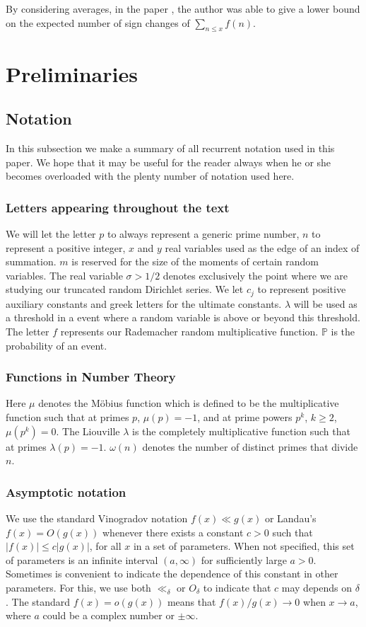 \documentclass[reqno0,12pt]{amsart}
\theoremstyle{remark}
\newcommand{\PP}{\mathbb{P}}
\begin{document}
By considering averages, in the paper \cite{aymone_sign_changes_III}, the author was able to give a lower bound on the expected number of sign changes of $\sum_{n\leq x}f(n)$. 


\section{Preliminaries}
\subsection{Notation} 
In this subsection we make a summary of all recurrent notation used in this paper. We hope that it may be useful for the reader always when he or she becomes overloaded with the plenty number of notation used here.

\subsubsection{Letters appearing throughout the text} We will let the letter $p$ to always represent a generic prime number, $n$ to represent a positive integer, $x$ and $y$ real variables used as the edge of an index of summation. $m$ is reserved for the size of the moments of certain random variables. The real variable $\sigma>1/2$ denotes exclusively the point where we are studying our truncated random Dirichlet series. We let $c_j$ to represent positive auxiliary constants and greek letters for the ultimate constants. $\lambda$ will be used as a threshold in a event where a random variable is above or beyond this threshold. The letter $f$ represents our Rademacher random multiplicative function. $\PP$ is the probability of an event.

\subsubsection{Functions in Number Theory} Here $\mu$ denotes the M\"obius function which is defined to be the multiplicative function such that at primes $p$, $\mu(p)=-1$, and at prime powers $p^k$, $k\geq 2$, $\mu(p^k)=0$. The Liouville $\lambda$ is the completely multiplicative function such that at primes $\lambda(p)=-1$. $\omega(n)$ denotes the number of distinct primes that divide $n$.

\subsubsection{Asymptotic notation} We use the standard Vinogradov notation $f(x)\ll g(x)$ or Landau's $f(x)=O(g(x))$ whenever there exists a constant $c>0$ such that $|f(x)|\leq c|g(x)|$, for all $x$ in a set of parameters. When not specified, this set of parameters is an infinite interval $(a,\infty)$ for sufficiently large $a>0$. Sometimes is convenient to indicate the dependence of this constant in other parameters. For this, we use both $\ll_\delta$ or $O_\delta$ to indicate that $c$ may depends on $\delta$. The standard $f(x)=o(g(x))$ means that $f(x)/g(x)\to0$ when $x\to a$, where $a$ could be a complex number or $\pm \infty$. 
\end{document}
